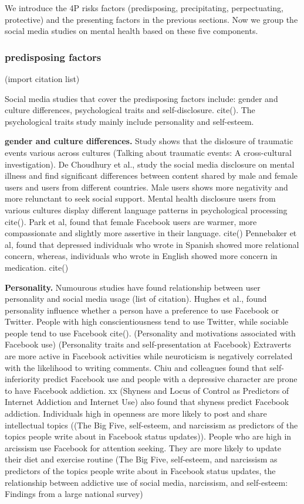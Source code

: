 We introduce the 4P risks factors (predisposing, precipitating, perpectuating, protective) and the presenting factors in the previous sections. Now we group the social media studies on mental health based on these five components. 

\subsubsection{predisposing factors} (import citation list)

Social media studies that cover the predisposing factors include: gender and culture differences, psychological traits and self-disclosure. cite(). The psychological traits study mainly include personality and self-esteem.

 \textbf{gender and culture differences.} Study shows that the dislosure of traumatic events various across cultures (Talking about traumatic events: A cross-cultural investigation). De Choudhury et al., study the social media disclosure on mental illness and find significant differences between content shared by male and female users and users from different countries. Male users shows more negativity and more relunctant to seek social support. Mental health disclosure users from various cultures display different language patterns in psychological processing cite(). Park et al, found that female Facebook users are warmer, more compassionate and slightly more assertive in their language. cite() Pennebaker et al, found that depressed individuals who wrote in Spanish showed more relational concern, whereas, individuals who wrote in English showed more concern in medication. cite()


 \textbf{Personality.} Numourous studies have found relationship between user personality and social media usage (list of citation). Hughes et al., found personality influence whether a person have a preference to use Facebook or Twitter. People with high conscientiousness tend to use Twitter, while sociable people tend to use Facebook cite().  (Personality and motivations associated with Facebook use) (Personality traits and self-presentation at Facebook) Extraverts are more active in Facebook activities while neuroticism is negatively correlated with the likelihood to writing comments. Chiu and colleagues found that self-inferiority predict Facebook use and people with a depressive character are prone to have Facebook addiction. xx (Shyness and Locus of Control as Predictors of Internet Addiction and Internet Use) also found that shyness predict Facebook addiction. Individuals high in openness are more likely to post and share intellectual topics ((The Big Five, self-esteem, and narcissism as predictors of the topics people write about in Facebook status updates)). People who are high in arcissism use Facebook for attention seeking. They are more likely to update their diet and exercise routine (The Big Five, self-esteem, and narcissism as predictors of the topics people write about in Facebook status updates, the relationship between addictive use of social media, narcissism, and self-esteem: Findings from a large national survey)

